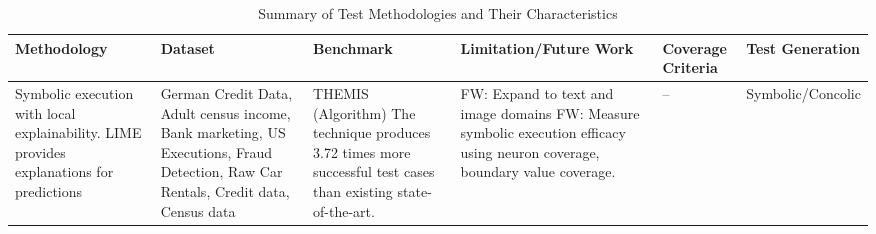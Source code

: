 \begin{landscape}
    \begin{xltabular}{\linewidth}{|>{\raggedright\arraybackslash}X|>{\raggedright\arraybackslash}X|>{\raggedright\arraybackslash}p{3.5cm}|>{\raggedright\arraybackslash}p{6cm}|>{\raggedright\arraybackslash}p{2.5cm}|>{\raggedright\arraybackslash}p{3cm}|} %
    \caption{Summary of Test Methodologies and Their Characteristics} \\
    \hline
    \textbf{Methodology} & \textbf{Dataset} & \textbf{Benchmark} & \textbf{Limitation/Future Work} & \textbf{Coverage Criteria} & \textbf{Test Generation} \\ \endhead
    
    Symbolic execution with local explainability. LIME provides explanations for predictions\cite{Agarwal} & German Credit Data, Adult census income, Bank marketing, US Executions, Fraud Detection, Raw Car Rentals, Credit data, Census data & THEMIS (Algorithm) The technique produces 3.72 times more successful test cases than existing state-of-the-art. & FW: Expand to text and image domains FW: Measure symbolic execution efficacy using neuron coverage, boundary value coverage. & -- & Symbolic/Concolic \\ \hline
    

\end{xltabular}
\end{landscape}
